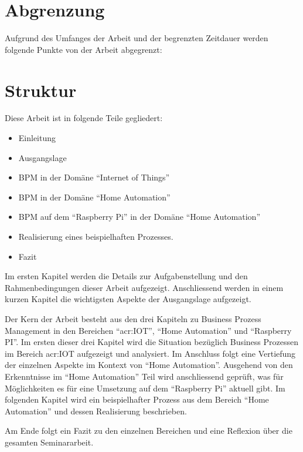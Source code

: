 \section{Abgrenzung} \label{sec:Abgrenzung}
Aufgrund des Umfanges der Arbeit und der begrenzten Zeitdauer werden folgende Punkte von der Arbeit abgegrenzt:

\begin{itemize}
\end{itemize}


\section{Struktur}
Diese Arbeit ist in folgende Teile gegliedert:

\begin{itemize}
\item Einleitung
\item Ausgangslage
\item BPM in der Domäne "`Internet of Things"'
\item BPM in der Domäne "`Home Automation"'
\item BPM auf dem "`Raspberry Pi"' in der Domäne "`Home Automation"'
\item Realisierung eines beispielhaften Prozesses.
\item Fazit
\end{itemize}

Im ersten Kapitel werden die Details zur Aufgabenstellung und den Rahmenbedingungen dieser Arbeit aufgezeigt. Anschliessend werden in einem kurzen Kapitel die wichtigsten Aspekte der Ausgangslage aufgezeigt.

Der Kern der Arbeit besteht aus den drei Kapiteln zu Business Prozess Management in den Bereichen "`\gls{acr:IOT}"', "`Home Automation"' und "`Raspberry PI"'. Im ersten dieser drei Kapitel wird die Situation bezüglich Business Prozessen im Bereich \gls{acr:IOT} aufgezeigt und analysiert. Im Anschluss folgt eine Vertiefung der einzelnen Aspekte im Kontext von "`Home Automation"'. Ausgehend von den Erkenntnisse im "`Home Automation"' Teil wird anschliessend geprüft, was für Möglichkeiten es für eine Umsetzung auf dem "`Raspberry Pi"' aktuell gibt. Im folgenden Kapitel wird ein beispielhafter Prozess aus dem Bereich "`Home Automation"' und dessen Realisierung  beschrieben.

Am Ende folgt ein Fazit zu den einzelnen Bereichen und eine Reflexion über die gesamten Seminararbeit.
